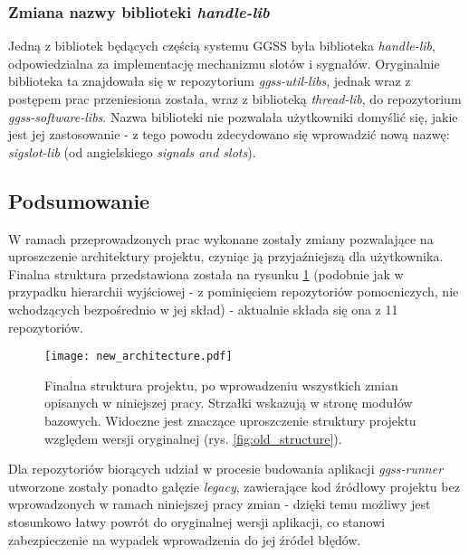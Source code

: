\subsubsection{Zmiana nazwy biblioteki \emph{handle-lib}}
Jedną z bibliotek będących częścią systemu GGSS była biblioteka \emph{handle-lib}, odpowiedzialna za implementację mechanizmu slotów i sygnałów. Oryginalnie biblioteka ta znajdowała się w repozytorium \emph{ggss-util-libs}, jednak wraz z postępem prac przeniesiona została, wraz z biblioteką \emph{thread-lib}, do repozytorium \emph{ggss-software-libs}. Nazwa biblioteki nie pozwalała użytkowniki domyślić się, jakie jest jej zastosowanie - z tego powodu zdecydowano się wprowadzić nową nazwę: \emph{sigslot-lib} (od angielskiego \emph{signals and slots}).


\subsection{Podsumowanie}
W ramach przeprowadzonych prac wykonane zostały zmiany pozwalające na uproszczenie architektury projektu, czyniąc ją przyjaźniejszą dla użytkownika. Finalna struktura przedstawiona została na rysunku \ref{fig:new_architecture} (podobnie jak w przypadku hierarchii wyjściowej - z pominięciem repozytoriów pomocniczych, nie wchodzących bezpośrednio w jej skład) - aktualnie składa się ona z 11 repozytoriów.

\begin{figure}[H]
\centering
\texttt{[image: new\_architecture.pdf]}
\caption{Finalna struktura projektu, po wprowadzeniu wszystkich zmian opisanych w niniejszej pracy. Strzałki wskazują w stronę modułów bazowych. Widoczne jest znaczące uproszczenie struktury projektu względem wersji oryginalnej (rys. \ref{fig:old_structure}).}
\label{fig:new_architecture}
\end{figure}

Dla repozytoriów biorących udział w procesie budowania aplikacji \emph{ggss-runner} utworzone zostały ponadto gałęzie \emph{legacy}, zawierające kod źródłowy projektu bez wprowadzonych w ramach niniejszej pracy zmian - dzięki temu możliwy jest stosunkowo łatwy powrót do oryginalnej wersji aplikacji, co stanowi zabezpieczenie na wypadek wprowadzenia do jej źródeł błędów.